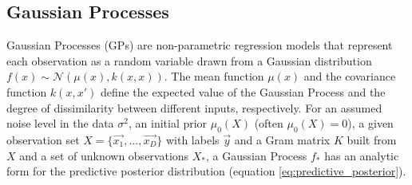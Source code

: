 \documentclass{IOS-Book-Article}
\begin{document}
\subsection{Gaussian Processes}
Gaussian Processes (GPs) are non-parametric regression models that represent each observation as a random variable drawn from a Gaussian distribution $f(x) \sim \mathcal{N}(\mu(x), k(x,x))$\cite{gaussian-processes}. The mean function $\mu(x)$ and the covariance function $k(x,x')$ define the expected value of the Gaussian Process and the degree of dissimilarity between different inputs, respectively. For an assumed noise level in the data $\sigma^2$, an initial prior $\mu_0(X)$ (often $\mu_0(X)=0$), a given observation set $X=\{\vec{x_1}, ..., \vec{x_D}\}$ with labels $\vec{y}$ and a Gram matrix $K$ built from $X$ and a set of unknown observations $X_*$, a Gaussian Process $f_*$ has an analytic form for the predictive posterior distribution (equation \ref{eq:predictive_posterior}).%

\end{document}

